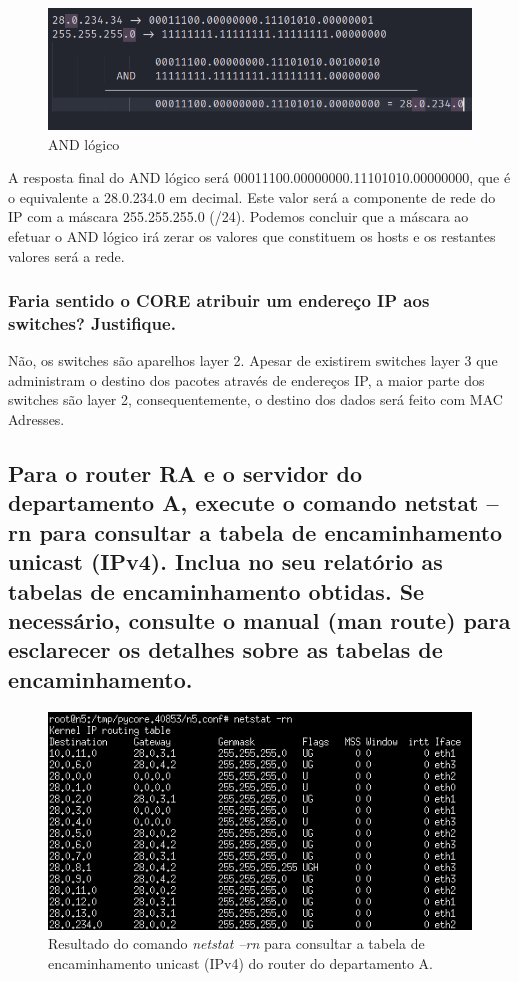 \documentclass{article}
\begin{document}
\begin{figure}[h]
    \centering
    \includegraphics[width=1\textwidth]{images/ANDlogic.png}
    \caption{\label{fig:pacote}AND lógico}
\end{figure}

A resposta final do AND lógico será 00011100.00000000.11101010.00000000, que é o equivalente a 28.0.234.0 em decimal. Este valor será a componente de rede do IP com a máscara 255.255.255.0 (/24). Podemos concluir que a máscara ao efetuar o AND lógico irá zerar os valores que constituem os hosts e os restantes valores será a rede.

\subsubsection{Faria sentido o CORE atribuir um endereço IP aos switches? Justifique.}

Não, os switches são aparelhos layer 2. Apesar de existirem switches layer 3 que administram o destino dos pacotes através de endereços IP, a maior parte dos switches são layer 2, consequentemente, o destino dos dados será feito com MAC Adresses.

\subsection{Para o router RA e o servidor do departamento A, execute o comando netstat –rn para consultar a tabela de encaminhamento unicast (IPv4). Inclua no seu relatório as tabelas de encaminhamento obtidas. Se necessário, consulte o manual (man route) para esclarecer os detalhes sobre as tabelas de encaminhamento.}

\begin{figure} [h]
    \centering
    \includegraphics[width=0.75\linewidth]{images/ra.png}
    \caption{Resultado do comando \textit{netstat –rn}
para consultar a tabela de encaminhamento unicast (IPv4) do router do departamento A.}
    \label{fig:enter-label}
\end{figure}
\end{document}
